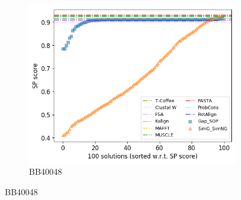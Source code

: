 \begin{figure}[!htbp]
\begin{adjustwidth}{-1cm}{-1cm}
\begin{subfigure}{0.22\textwidth}
			\includegraphics[width=\columnwidth]{Figure/summary/precomputedInit/Balibase/BB40048_pairs_density_single_run_2}
			\caption{BB40048}
		\end{subfigure}
	

\end{adjustwidth}
\end{figure}
